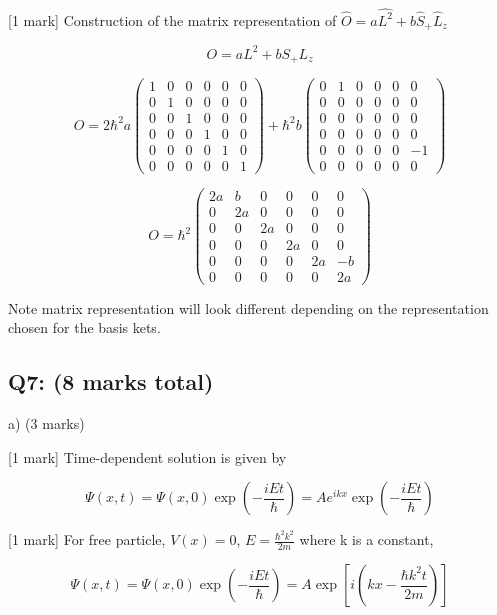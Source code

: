 \documentclass[a4paper,11pt]{article}
\begin{document}
[1 mark] Construction of the matrix representation of \( \hat{O} = a\hat{L^{2}} + b\hat{S}_{+}\hat{L}_{z} \)

\[ O = a L^2 + b S_{+}L_z \]

\[
O = 2\hbar^2 a \begin{pmatrix} 1 & 0 & 0 & 0 & 0 & 0\\  0 & 1 & 0 & 0 & 0 & 0\\ 0 & 0 & 1 & 0 & 0 & 0\\ 0 & 0 & 0 & 1 & 0 & 0\\ 0 & 0 & 0 & 0 & 1 & 0\\ 0 & 0 & 0 & 0 & 0 & 1 \end{pmatrix} + \hbar^2 b \begin{pmatrix} 0 & 1 & 0 & 0 & 0 & 0\\ 0 & 0 & 0 & 0 & 0 & 0\\ 0 & 0 & 0 & 0 & 0 & 0\\ 0 & 0 & 0 & 0 & 0 & 0\\ 0 & 0 & 0 & 0 & 0 & -1\\ 0 & 0 & 0 & 0 & 0 & 0 \end{pmatrix}
\]

\[ 
O = \hbar^2 \begin{pmatrix} 2a & b & 0 & 0 & 0 & 0\\ 0 & 2a & 0 & 0 & 0 & 0\\ 0 & 0 & 2a & 0 & 0 & 0\\ 0 & 0 & 0 & 2a & 0 & 0\\ 0 & 0 & 0 & 0 & 2a & -b\\ 0 & 0 & 0 & 0 & 0 & 2a \end{pmatrix}
\]

Note matrix representation will look different depending on the representation chosen for the basis kets. 

\subsection*{Q7: (8 marks total)}

a) (3 marks)

[1 mark] Time-dependent solution is given by 

\[ \Psi(x,t) = \Psi(x,0) \exp(- \frac{iEt}{\hbar}) =  Ae^{ikx} \exp(- \frac{iEt}{\hbar})  \]

[1 mark] For free particle, \( V(x) = 0 \), \( E = \frac{\hbar^2 k^2}{2m} \) where k is a constant, 

\[ \Psi(x,t) = \Psi(x,0) \exp(- \frac{iEt}{\hbar}) =  A \exp\left[ i \left( kx - \frac{\hbar k^2 t}{2m} \right) \right] \]
\end{document}
